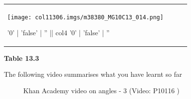 \begin{table}[H]
\begin{center}
\begin{xtabular*}{\mytablewidth}[t]{|p{3cm}|p{3cm}|p{3cm}|p{20\mystarwidth}|}
    
        
                  
    \setcounter{subfigure}{0}

\label{m38380*id317099}
    \begin{center}
   
\label{m38380*id317099!!!underscore!!!media}\label{
m38380*id317099!!!underscore!!!printimage}\texttt{[image: 
col11306.imgs/m38380\_MG10C13\_014.png]} %
        
      \vspace{2pt}
    \vspace{.1in}
    
    \end{center}



    \addtocounter{footnote}{-0}
    
'0' | 'false' | '' || col4 '0' | 'false' | ''
     \tabularnewline{}
    \end{xtabular*}
      \end{center}
    \begin{center}{\small\bfseries Table 13.3}\end{center}
    
    \addtocounter{footnote}{-0}
    
    \par
  
\label{m38380*eip-918}The following video summarises what you have learnt so far


    \setcounter{subfigure}{0}


	\begin{figure}[H] %
    
    
    \textnormal{Khan Academy video on angles - 3}\vspace{.1in} \nopagebreak
  \label{m38380*yt-media3}\label{m38380*yt-video3}
             { (Video:  P10116
)}
      

\end{figure}
\end{table}
